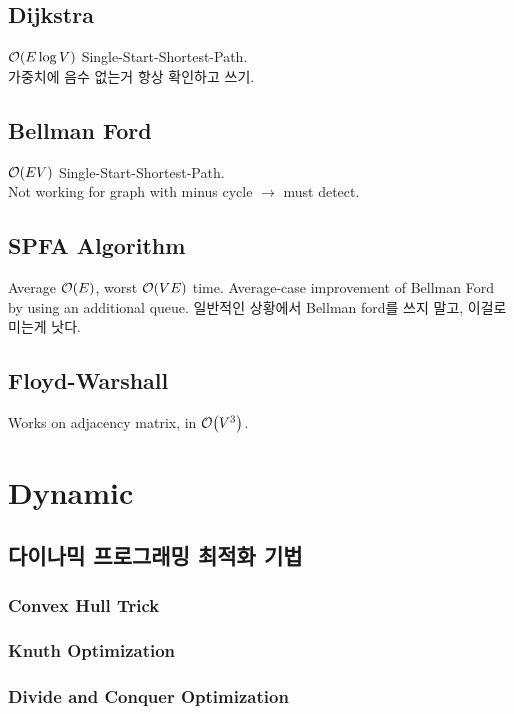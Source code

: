 \documentclass[landscape,8pt]{article}
\begin{document}
\begin{multicols}{2}
  \subsection{Dijkstra}
    $\order{E \log V}$ Single-Start-Shortest-Path.\\
    가중치에 음수 없는거 항상 확인하고 쓰기.
      

  \subsection{Bellman Ford}
    $\order{EV}$ Single-Start-Shortest-Path.\\
    Not working for graph with minus cycle $\rightarrow$ must detect.
      

  \subsection{SPFA Algorithm}
    Average $\order{E}$, worst $\order{VE}$
    time. Average-case improvement of Bellman Ford by using an additional queue. 일반적인 상황에서 Bellman ford를 쓰지 말고, 이걸로 미는게 낫다.
    

  \subsection{Floyd-Warshall}
    Works on adjacency matrix, in $\order{V^3}$.
      

\columnbreak

\section{Dynamic}
  \subsection{다이나믹 프로그래밍 최적화 기법}
  \subsubsection{Convex Hull Trick}
  \subsubsection{Knuth Optimization}
  \subsubsection{Divide and Conquer Optimization}

\end{multicols}
\end{document}
